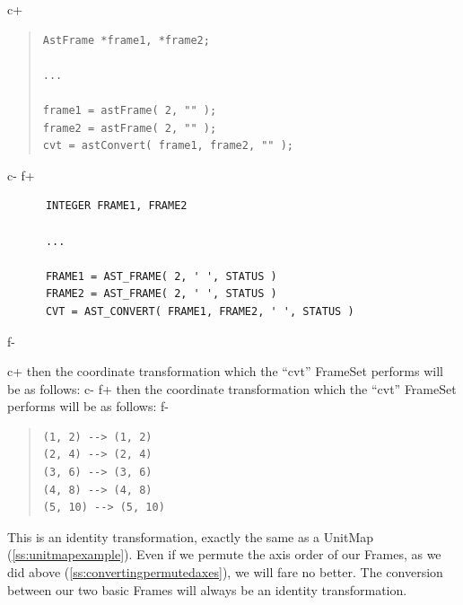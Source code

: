 \documentclass[twoside,11pt]{article}
\newcommand{\secref}[1]{\S\ref{#1}}
\renewcommand{\secref}[1]{\ref{#1}}
\begin{document}
c+
\begin{quote}
\small
\begin{verbatim}
AstFrame *frame1, *frame2;

...

frame1 = astFrame( 2, "" );
frame2 = astFrame( 2, "" );
cvt = astConvert( frame1, frame2, "" );
\end{verbatim}
\normalsize
\end{quote}
c-
f+
\small
\begin{verbatim}
      INTEGER FRAME1, FRAME2

      ...

      FRAME1 = AST_FRAME( 2, ' ', STATUS )
      FRAME2 = AST_FRAME( 2, ' ', STATUS )
      CVT = AST_CONVERT( FRAME1, FRAME2, ' ', STATUS )
\end{verbatim}
\normalsize
f-

c+
then the coordinate transformation which the ``cvt'' FrameSet performs
will be as follows:
c-
f+
then the coordinate transformation which the ``cvt'' FrameSet performs
will be as follows:
f-

\begin{quote}
\begin{verbatim}
(1, 2) --> (1, 2)
(2, 4) --> (2, 4)
(3, 6) --> (3, 6)
(4, 8) --> (4, 8)
(5, 10) --> (5, 10)
\end{verbatim}
\end{quote}

This is an identity transformation, exactly the same as a UnitMap
(\secref{ss:unitmapexample}). Even if we permute the axis order of our
Frames, as we did above (\secref{ss:convertingpermutedaxes}), we will
fare no better. The conversion between our two basic Frames will
always be an identity transformation.
\end{document}
